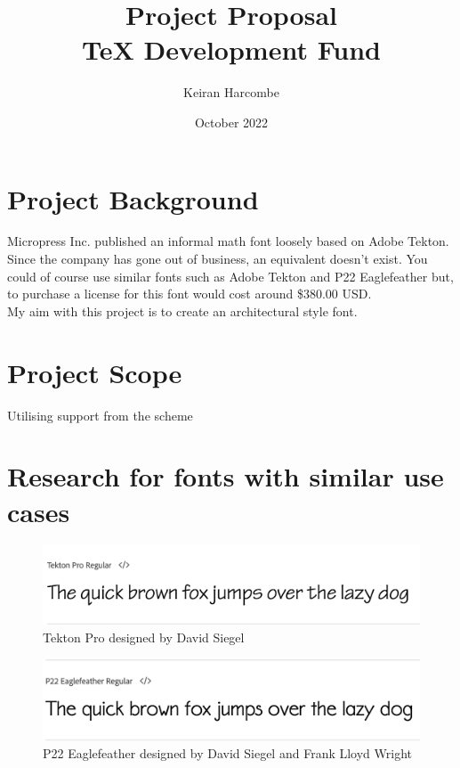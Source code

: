 \documentclass[a4paper]{article}
\title{Project Proposal \\ TeX Development Fund}
\author{Keiran Harcombe}
\date{October 2022}
\begin{document}
\maketitle
\section{Project Background} %
Micropress Inc. published an informal math font loosely based on Adobe Tekton. Since the company has gone out of business, an equivalent doesn't exist. You could of course use similar fonts such as Adobe Tekton and P22 Eaglefeather but, to purchase a license for this font would cost around \$380.00 USD. \\
My aim with this project is to create an architectural style font. 

\section{Project Scope} %
Utilising support from the scheme
\pagebreak

\section{Research for fonts with similar use cases}
    \begin{figure}[h]
        \includegraphics[width=1\textwidth]{Tekton.png}
        \caption{Tekton Pro designed by David Siegel\cite{tekton}}
        \label{fig:tekton}
    \end{figure}
    
    \begin{figure}[h]
        \includegraphics[width=1\textwidth]{Eaglefeather.png}
        \caption{P22 Eaglefeather designed by David Siegel and Frank Lloyd Wright\cite{eaglefeather}}
        \label{fig:eaglefeather}
    \end{figure}
\end{document}
